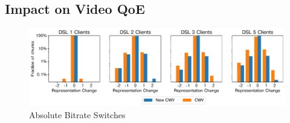\documentclass[10pt,sigconf,anonymous]{acmart}
\newcommand{\todo}[1]{\textbf{\textcolor{red}{To do: #1}}}
\begin{document}



\subsection{Impact on Video QoE}
\label{sec:QoE-impact}

\begin{figure}
  \centering
  \includegraphics[width=\textwidth, keepaspectratio]{figures/bitrate_derivative_distribution.pdf}
  \caption{Absolute Bitrate Switches}
  \label{fig:bitrate-switches}
\end{figure}
\end{document}

